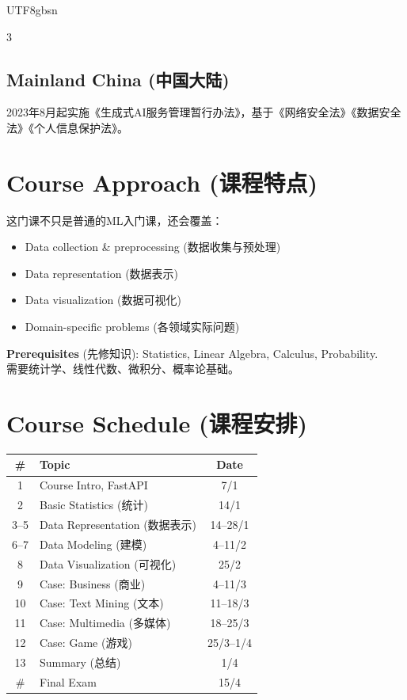 \documentclass[10pt,landscape,a4paper]{article}
\newcommand{\zhint}[1]{{\scriptsize\color{gray!70!black}#1}}
\begin{document}
\begin{CJK}{UTF8}{gbsn}
\begin{multicols}{3}
\subsection{Mainland China \zhint{(中国大陆)}}
\zhint{2023年8月起实施《生成式AI服务管理暂行办法》，基于《网络安全法》《数据安全法》《个人信息保护法》。}

\section{Course Approach \zhint{(课程特点)}}

\zhint{这门课不只是普通的ML入门课，还会覆盖：}
\begin{itemize}[leftmargin=*, nosep, itemsep=0pt]
    \item Data collection \& preprocessing \zhint{(数据收集与预处理)}
    \item Data representation \zhint{(数据表示)}
    \item Data visualization \zhint{(数据可视化)}
    \item Domain-specific problems \zhint{(各领域实际问题)}
\end{itemize}

\textbf{Prerequisites} \zhint{(先修知识)}: Statistics, Linear Algebra, Calculus, Probability.\\
\zhint{需要统计学、线性代数、微积分、概率论基础。}

\section{Course Schedule \zhint{(课程安排)}}

\begin{center}
\scriptsize
\begin{tabular}{clc}
\toprule
\# & Topic & Date \\
\midrule
1 & Course Intro, FastAPI & 7/1 \\
2 & Basic Statistics \zhint{(统计)} & 14/1 \\
3--5 & Data Representation \zhint{(数据表示)} & 14--28/1 \\
6--7 & Data Modeling \zhint{(建模)} & 4--11/2 \\
8 & Data Visualization \zhint{(可视化)} & 25/2 \\
9 & Case: Business \zhint{(商业)} & 4--11/3 \\
10 & Case: Text Mining \zhint{(文本)} & 11--18/3 \\
11 & Case: Multimedia \zhint{(多媒体)} & 18--25/3 \\
12 & Case: Game \zhint{(游戏)} & 25/3--1/4 \\
13 & Summary \zhint{(总结)} & 1/4 \\
\# & Final Exam & 15/4 \\
\bottomrule
\end{tabular}
\end{center}


\end{multicols}
\end{CJK}
\end{document}
